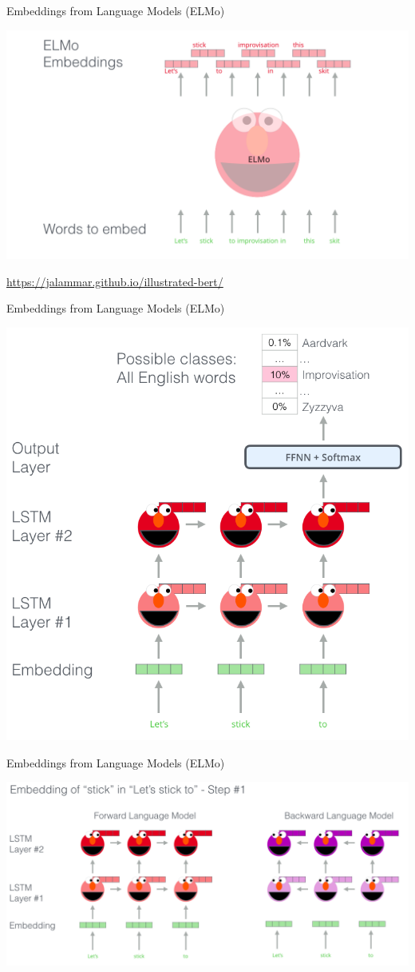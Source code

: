 \documentclass[notes,12pt, aspectratio=169]{beamer}
\begin{document}
\begin{frame}{ Embeddings from Language Models (ELMo)}
	\begin{center}
		\includegraphics[width=.8\linewidth]{elmo1.png}
	\end{center}
	\vfill
	\footnotesize
	{\color{blue} \url{https://jalammar.github.io/illustrated-bert/}  } 
\end{frame}


\begin{frame}{ Embeddings from Language Models (ELMo)}
	\begin{center}
		\includegraphics[width=.5\linewidth]{elmo2.png}
	\end{center}
\end{frame}

\begin{frame}{ Embeddings from Language Models (ELMo)}
	\begin{center}
		\includegraphics[width=.9\linewidth]{elmo3.png}
	\end{center}
\end{frame}
\end{document}
